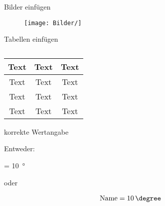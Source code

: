 
Bilder einfügen

\begin{figure}[h]
\centering
\texttt{[image: Bilder/]}
\caption{} %
\label{}
\end{figure}



Tabellen einfügen

\begin{table}[!htb]
    \centering
    \caption{} %
    \label{}
    \begin{tabular}{c|c|c}
Text & Text & Text\\
\hline
Text & Text & Text\\
Text & Text & Text\\
Text & Text & Text\\
    \end{tabular}
\end{table}


korrekte Wertangabe

Entweder:

 = \SI{10}{\degree}

oder

\begin{align}
\mathrm{Name} = 10\,\mathrm{\degree}
\end{align}




